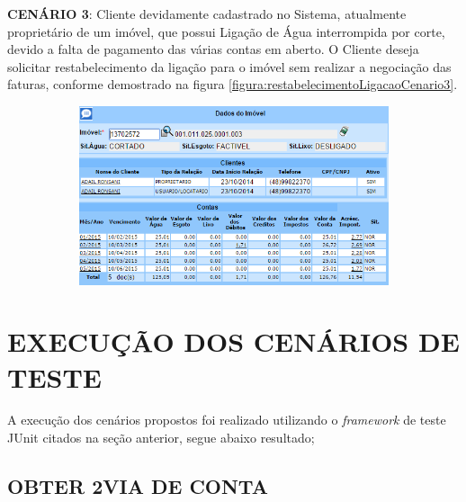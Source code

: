 \begin{flushleft}
	\begin{description}
		\item \textbf{CENÁRIO 3}: Cliente devidamente cadastrado no Sistema, atualmente proprietário de um imóvel, que possui Ligação de Água interrompida por corte, devido a falta de pagamento das várias contas em aberto. O Cliente deseja solicitar restabelecimento da ligação para o imóvel sem realizar a negociação das faturas, conforme demostrado na figura \ref{figura:restabelecimentoLigacaoCenario3}.
		\begin{figure}[H]
			\centering
			\caption{Restabelecimento da Ligação de Água - Cenário de Teste 3}
			\label{figura:restabelecimentoLigacaoCenario3}
			\begin{subfigure}[H]{\textwidth}
				\centering
				\includegraphics{figuras/cenarios/restabelecimento/cenario_3.PNG}
			\end{subfigure}
		\end{figure}
	\end{description}

\end{flushleft}	


\section{\textbf{\uppercase{Execução dos Cenários de Teste}}}


A execução dos cenários propostos foi realizado utilizando o \textit{framework} de teste JUnit citados na seção anterior, segue abaixo resultado; 

\subsection{\textbf{\uppercase{Obter 2\textordfeminine  \space Via de Conta}}}
 
